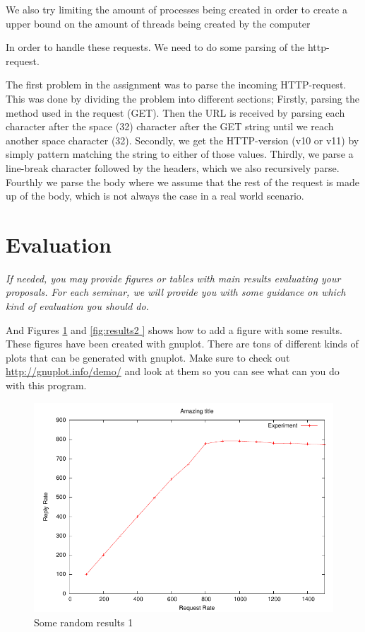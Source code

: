 \documentclass[a4paper, 11pt]{article}
\begin{document}
We also try limiting the amount of processes being created in order to create a upper bound on the amount of threads being created by the computer


In order to handle these requests. We need to do some parsing of the http-request.

The first problem in the assignment was to parse the incoming HTTP-request. This was done by dividing the problem into different sections;
Firstly, parsing the method used in the request (GET). Then the URL is received by parsing each character after the space (32) character after the GET string until we reach another space character (32).
Secondly, we get the HTTP-version (v10 or v11) by simply pattern matching the string to either of those values.
Thirdly, we parse a line-break character followed by the headers, which we also recursively parse.
Fourthly we parse the body where we assume that the rest of the request is made up of the body, which is not always the case in a real world scenario.

\section{Evaluation}

\textit{If needed, you may provide figures or tables with main results
  evaluating your proposals. For each seminar, we will provide you
  with some guidance on which kind of evaluation you should do.}

And Figures \ref{fig:results1} and \ref{fig:results2 } shows how to
add a figure with some results. These figures have been created with
gnuplot. There are tons of different kinds of plots that can be
generated with gnuplot. Make sure to check out
\url{http://gnuplot.info/demo/} and look at them so you can see what
can you do with this program.


\begin{figure}
  \begin{center}
    \includegraphics{results1.pdf}
    \caption{Some random results 1}
    \label{fig:results1}
  \end{center}
\end{figure}
\end{document}

